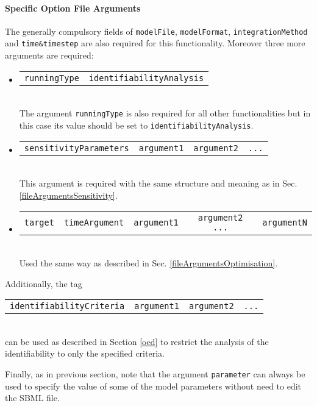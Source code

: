 \documentclass[a4paper, 11pt]{article}
\begin{document}
\paragraph{Specific Option File Arguments}
The generally compulsory fields of \texttt{modelFile}, \texttt{modelFormat}, \texttt{integrationMethod} and \texttt{time\&timestep} are also required for this functionality.
Moreover three more arguments are required:
\begin{itemize}
  \item \begin{tabular}{cc}\texttt{runningType}&\texttt{identifiabilityAnalysis}\end{tabular}\\[1.5ex]
    The argument \texttt{runningType} is also required for all other functionalities but in this case its value should be set to \texttt{identifiabilityAnalysis}.
  \item \begin{tabular}{cccc}\texttt{sensitivityParameters}&\texttt{argument1}&\texttt{argument2}&\texttt{...}\end{tabular}\\[1.5ex]
    This argument is required with the same structure and meaning as in Sec. \ref{fileArgumentsSensitivity}.
  \item \begin{tabular}{ccccc}\texttt{target}&\texttt{timeArgument}&\texttt{argument1}&\texttt{argument2 ...}&\texttt{argumentN}\end{tabular}\\[1.5ex]
    Used the same way as described in Sec. \ref{fileArgumentsOptimisation}.
\end{itemize}
Additionally, the tag\\[1.5ex]
\begin{tabular}{cccc}\texttt{identifiabilityCriteria}&\texttt{argument1}&\texttt{argument2}&\texttt{...}\end{tabular}\\[1.5ex]
can be used as described in Section \ref{oed} to restrict the analysis of the identifiability to only the specified criteria.

Finally, as in previous section, note that the argument \texttt{parameter} can always be used to specify the value of some of the model parameters without need to edit the SBML file.
\end{document}
